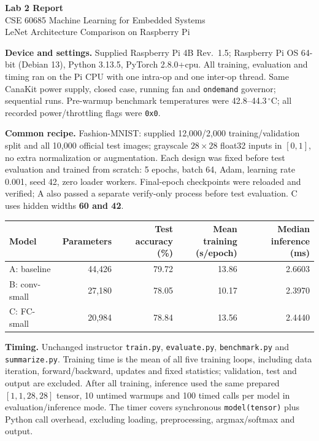 \documentclass[11pt,letterpaper]{article}
\begin{document}
\begin{center}
{\Large\bfseries Lab 2 Report}\\[4pt]
CSE 60685 Machine Learning for Embedded Systems\\[2pt]
LeNet Architecture Comparison on Raspberry Pi
\end{center}

\textbf{Device and settings.} Supplied Raspberry Pi 4B Rev.\ 1.5; Raspberry Pi OS 64-bit (Debian 13), Python 3.13.5, PyTorch 2.8.0+cpu. All training, evaluation and timing ran on the Pi CPU with one intra-op and one inter-op thread. Same CanaKit power supply, closed case, running fan and \texttt{ondemand} governor; sequential runs. Pre-warmup benchmark temperatures were 42.8--44.3\,$^{\circ}$C; all recorded power/throttling flags were \texttt{0x0}.

\textbf{Common recipe.} Fashion-MNIST: supplied 12,000/2,000 training/validation split and all 10,000 official test images; grayscale $28\times28$ float32 inputs in $[0,1]$, no extra normalization or augmentation. Each design was fixed before test evaluation and trained from scratch: 5 epochs, batch 64, Adam, learning rate 0.001, seed 42, zero loader workers. Final-epoch checkpoints were reloaded and verified; A also passed a separate verify-only process before test evaluation. C uses hidden widths \textbf{60 and 42}.

\begin{center}
\begin{tabular}{lrrrr}
\toprule
Model & Parameters & \shortstack{Test accuracy\\(\%)} & \shortstack{Mean training\\(s/epoch)} & \shortstack{Median inference\\(ms)}\\
\midrule
A: baseline & 44,426 & 79.72 & 13.86 & 2.6603 \\
B: conv-small & 27,180 & 78.05 & 10.17 & 2.3970 \\
C: FC-small & 20,984 & 78.84 & 13.56 & 2.4440 \\
\bottomrule
\end{tabular}
\end{center}

\textbf{Timing.} Unchanged instructor \texttt{train.py}, \texttt{evaluate.py}, \texttt{benchmark.py} and \texttt{summarize.py}. Training time is the mean of all five training loops, including data iteration, forward/backward, updates and fixed statistics; validation, test and output are excluded. After all training, inference used the same prepared $[1,1,28,28]$ tensor, 10 untimed warmups and 100 timed calls per model in evaluation/inference mode. The timer covers synchronous \texttt{model(tensor)} plus Python call overhead, excluding loading, preprocessing, argmax/softmax and output.
\end{document}
